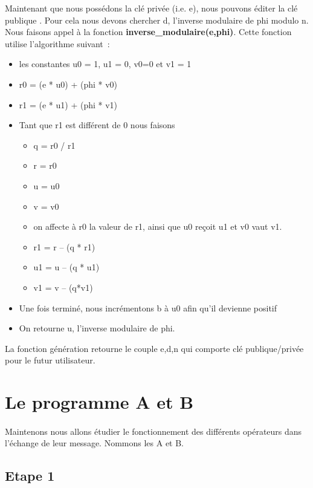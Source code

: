 \documentclass[11pt,fleqn]{book} %
\begin{document}
\vspace{0.5cm}Maintenant que nous possédons la clé privée (i.e. e), nous pouvons éditer la clé publique	. Pour cela 
nous devons chercher d, l'inverse modulaire de phi modulo n. Nous faisons appel à la fonction \textbf{inverse\_modulaire(e,phi)}. Cette fonction utilise l’algorithme suivant :
\begin{itemize}
\item les constantes u0 = 1, u1 = 0, v0=0 et v1 = 1
\item r0 = (e * u0) + (phi * v0)
\item r1 = (e * u1) + (phi * v1)
\item Tant que r1 est différent de 0 nous faisons
	\begin{itemize}
	\item q = r0 / r1
	\item r = r0
	\item u = u0
	\item v = v0
	\item on affecte à r0 la valeur de r1, ainsi que u0 reçoit u1 et v0 vaut v1.
	\item r1 = r – (q * r1)
	\item u1 = u – (q * u1)
	\item v1 = v – (q*v1)
	\end{itemize}

\item Une fois terminé,  nous incrémentons b à u0 afin qu'il devienne positif
\item On retourne u, l'inverse modulaire de phi.
\end{itemize}
\vspace{0.5cm}La fonction génération retourne le couple e,d,n qui comporte clé publique/privée pour le futur utilisateur.


\section{Le programme A et B}
\paragraph{}Maintenons nous allons étudier le fonctionnement des différents opérateurs dans l'échange de leur message. Nommons les A et B. 
\subsection{Etape 1}
\end{document}
